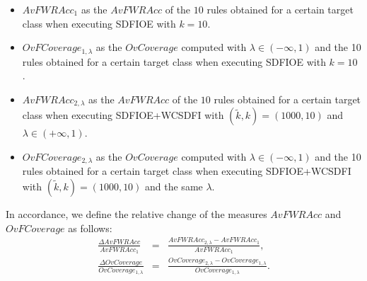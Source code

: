 \begin{itemize}
	\item $AvFWRAcc_1$ as the $AvFWRAcc$ of the $10$ rules obtained for  a certain target class when executing SDFIOE with $k=10$.
	\item $OvFCoverage_{1,\lambda}$ as the $OvCoverage$ computed with $\lambda \in (-\infty,1)$ and the 10 rules obtained for a certain target class when executing SDFIOE with $k=10$ .
	\item $AvFWRAcc_{2,\lambda}$ as the $AvFWRAcc$ of the $10$ rules obtained for  a certain target class when executing SDFIOE+WCSDFI with $(\tilde{k},k)=(1000,10)$ and $\lambda \in (+\infty,1)$.
	\item $OvFCoverage_{2,\lambda}$ as the $OvCoverage$ computed with $\lambda \in (-\infty,1)$ and the 10 rules obtained for a certain target class when executing SDFIOE+WCSDFI with $(\tilde{k},k)=(1000,10)$ and the same $\lambda$.
\end{itemize}
In accordance, we define the relative change of the measures $AvFWRAcc$ and $OvFCoverage$ as follows:
\begin{eqnarray*}
	\frac{\Delta AvFWRAcc}{AvFWRAcc_1} &=& \frac{AvFWRAcc_{2,\lambda} - AvFWRAcc_1}{AvFWRAcc_1}, \\
	\frac{\Delta OvCoverage}{OvCoverage_{1,\lambda}} &=& \frac{OvCoverage_{2,\lambda}-OvCoverage_{1,\lambda}}{OvCoverage_{1,\lambda}}.
\end{eqnarray*}

